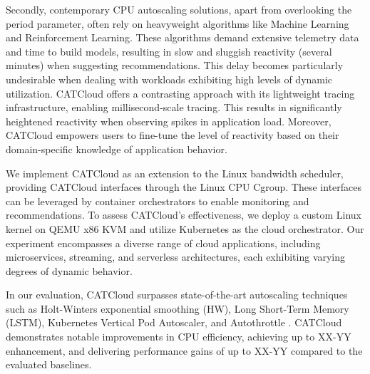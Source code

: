 Secondly, contemporary CPU autoscaling solutions, apart from overlooking the period parameter, often rely on heavyweight algorithms like Machine Learning and Reinforcement Learning. These algorithms demand extensive telemetry data and time to build models, resulting in slow and sluggish reactivity (several minutes) when suggesting recommendations. This delay becomes particularly undesirable when dealing with workloads exhibiting high levels of dynamic utilization. CATCloud offers a contrasting approach with its lightweight tracing infrastructure, enabling millisecond-scale tracing. This results in significantly heightened reactivity when observing spikes in application load. Moreover, CATCloud empowers users to fine-tune the level of reactivity based on their domain-specific knowledge of application behavior.

We implement CATCloud as an extension to the Linux bandwidth scheduler, providing CATCloud interfaces through the Linux CPU Cgroup. These interfaces can be leveraged by container orchestrators to enable monitoring and recommendations. To assess CATCloud's effectiveness, we deploy a custom Linux kernel on QEMU x86 KVM and utilize Kubernetes as the cloud orchestrator. Our experiment encompasses a diverse range of cloud applications, including microservices, streaming, and serverless architectures, each exhibiting varying degrees of dynamic behavior.

In our evaluation, CATCloud surpasses state-of-the-art autoscaling techniques such as Holt-Winters exponential smoothing (HW), Long Short-Term Memory (LSTM), Kubernetes Vertical Pod Autoscaler, and Autothrottle . CATCloud demonstrates notable improvements in CPU efficiency, achieving up to XX-YY enhancement, and delivering performance gains of up to XX-YY compared to the evaluated baselines.